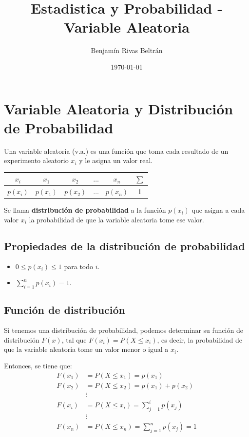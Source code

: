 \documentclass{article}
\title{Estadistica y Probabilidad - Variable Aleatoria}
\author{Benjamín Rivas Beltrán}
\date{\today}
\theoremstyle{definition}
\theoremstyle{plain}
\theoremstyle{remark}
\begin{document}
\maketitle

\section{Variable Aleatoria y Distribución de Probabilidad}

Una variable aleatoria (v.a.) es una función que toma cada resultado de un experimento aleatorio $x_i$ y le asigna un valor real.

\begin{table}[h]
\centering
\begin{tabular}{|c|c|c|c|c|c|}
\hline
$x_i$ & $x_1$ & $x_2$ & $\ldots$ & $x_n$ & $\sum$ \\
\hline
$p(x_i)$ & $p(x_1)$ & $p(x_2)$ & $\ldots$ & $p(x_n)$ & 1 \\
\hline
\end{tabular}
\end{table}

Se llama \textbf{distribución de probabilidad} a la función $p(x_i)$ que asigna a cada valor $x_i$ la probabilidad de que la variable aleatoria tome ese valor.

\subsection{Propiedades de la distribución de probabilidad}
\begin{itemize}
  \item $0 \leq p(x_i) \leq 1$ para todo $i$.
    \item $\sum_{i=1}^{n} p(x_i) = 1$.
\end{itemize}

\subsection{Función de distribución}
Si tenemos una distribución de probabilidad, podemos determinar su función de distribución $F(x)$, tal que $F(x_i) = P(X \leq x_i)$, es decir, la probabilidad de que la variable aleatoria tome un valor menor o igual a $x_i$.

Entonces, se tiene que:
\begin{align*}
F(x_1) &= P(X \leq x_1) = p(x_1) \\
F(x_2) &= P(X \leq x_2) = p(x_1) + p(x_2) \\
&\vdots \\
F(x_i) &= P(X \leq x_i) = \sum_{j=1}^{i} p(x_j) \\
&\vdots \\
F(x_n) &= P(X \leq x_n) = \sum_{j=1}^{n} p(x_j) = 1
\end{align*}
\end{document}
